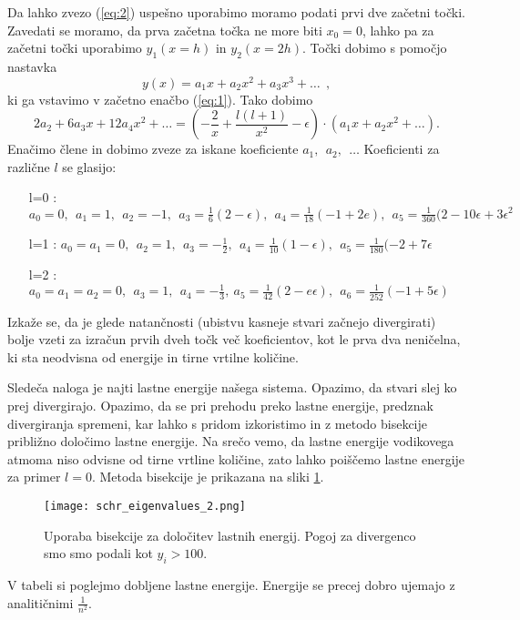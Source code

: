 \documentclass[12pt,a4paper]{article}
\begin{document}
Da lahko zvezo (\ref{eq:2}) uspešno uporabimo moramo podati prvi dve začetni točki. Zavedati se moramo, da prva začetna točka ne more biti $x_0=0$, lahko pa za začetni točki uporabimo $y_1(x=h)$ in $y_2(x=2h)$. Točki dobimo s pomočjo nastavka
\begin{equation}
y(x)=a_1 x +a_2 x^{2} + a_3 x^{3} + \dots  \ \ , \nonumber
\end{equation}
ki ga vstavimo v začetno enačbo (\ref{eq:1}). Tako dobimo
\begin{equation}
2a_2 + 6a_3 x + 12 a_4 x^{2} + \dots =\left(-\frac{2}{x} + \frac{l(l+1)}{x^{2}} -\epsilon\right)\cdot (a_1 x + a_2 x^{2} + \dots).
\end{equation}
Enačimo člene in dobimo zveze za iskane koeficiente $a_1, \ \ a_2, \ \ \dots$ Koeficienti za različne $l$ se glasijo:
\begin{itemize}
\item[l=0]: $a_0=0, \ \ a_1 = 1, \ \ a_2 = -1, \ \ a_3 = \frac{1}{6}(2-\epsilon), \ \ a_4= \frac{1}{18}(-1 +2e) , \ \ a_5 = \frac{1}{360}(2-10\epsilon + 3 \epsilon ^{2}$
\item[l=1]: $a_0=a_1=0, \ \ a_2=1, \ \ a_3 = -\frac{1}{2}, \ \ a_4= \frac{1}{10}(1-\epsilon), \ \ a_5 = \frac{1}{180}(-2+7 \epsilon$
\item[l=2]: $a_0=a_1=a_2=0, \ \ a_3=1, \ \ a_4 =-\frac{1}{3}, \ a_5 = \frac{1}{42}(2-e\epsilon), \ \ a_6= \frac{1}{252}(-1 +5 \epsilon)$
\end{itemize}
Izkaže se, da je glede natančnosti (ubistvu kasneje stvari začnejo divergirati) bolje vzeti za izračun prvih dveh točk več koeficientov, kot le prva dva neničelna, ki sta neodvisna od energije in tirne vrtilne količine.

Sledeča naloga je najti lastne energije našega sistema. Opazimo, da stvari slej ko prej divergirajo. Opazimo, da se pri prehodu preko lastne energije, predznak divergiranja spremeni, kar lahko s pridom izkoristimo in z metodo bisekcije približno določimo lastne energije. Na srečo vemo, da lastne energije vodikovega atmoma niso odvisne od tirne vrtline količine, zato lahko poiščemo lastne energije za primer $l=0$.
Metoda bisekcije je prikazana na sliki \ref{fig:slika1}.

\begin{figure}[H]
    \centering
        \texttt{[image: schr\_eigenvalues\_2.png]}
    \caption{Uporaba bisekcije za določitev lastnih energij. Pogoj za divergenco smo smo podali kot $y_i > 100$.} \label{fig:slika1}
\end{figure}
\noindent V tabeli si poglejmo dobljene lastne energije. Energije se precej dobro ujemajo z analitičnimi $\frac{1}{n^{2}}$.
\end{document}
